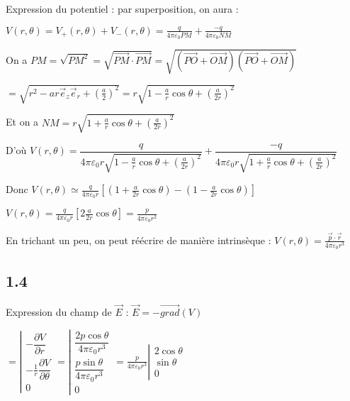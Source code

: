 \documentclass[a4paper,12pt]{book}
\begin{document}
\par Expression du potentiel : par superposition, on aura :
\par $V(r,\theta) = V_+(r,\theta)+V_-(r,\theta)=\frac{q}{4\pi\varepsilon_0PM} + \frac{-q}{4\pi\varepsilon_0NM}$
\par On a $PM=\sqrt{PM^2}=\sqrt{\vec{PM}\cdot\vec{PM}}=\sqrt{(\vec{PO}+\vec{OM})(\vec{PO}+\vec{OM})}$ \par $= \sqrt{r^2-ar\vec{e}_z\vec{e}_r+\left(\frac{a}{2}\right)^2} = r\sqrt{1-\frac{a}{r}\cos\theta + \left(\frac{a}{2r}\right)^2}$
\par Et on a $NM= r\sqrt{1+\frac{a}{r}\cos\theta + \left(\frac{a}{2r}\right)^2}$
\par D'où $V(r,\theta)=\dfrac{q}{4\pi\varepsilon_0 r\sqrt{1-\frac{a}{r}\cos\theta + \left(\frac{a}{2r}\right)^2}}+\dfrac{-q}{4\pi\varepsilon_0 r\sqrt{1+\frac{a}{r}\cos\theta + \left(\frac{a}{2r}\right)^2}}$
\par Donc $V(r,\theta)\simeq\frac{q}{4\pi\varepsilon_0r}\left[\left(1+\frac{a}{2r}\cos\theta\right)-\left(1-\frac{a}{2r}\cos\theta\right)\right]$
\par $V(r,\theta)=\frac{q}{4\pi\varepsilon_0 r}\left[2\frac{a}{2r}\cos\theta\right]= \frac{p}{4\pi\varepsilon_0r^2}$
\par En trichant un peu, on peut réécrire de manière intrinsèque : $V(r,\theta)=\frac{\vec{p}\cdot\vec{r}}{4\pi\varepsilon_0r^3}$

\subsection{1.4}
Expression du champ de $\vec{E}$ : $\vec{E}=-\vec{grad}(V)$
\par $ = \left|\begin{matrix} -\dfrac{\partial V}{\partial r} \\ -\frac{1}{r}\dfrac{\partial V}{\partial \theta} \\ 0\end{matrix}\right. =\left|\begin{matrix} \dfrac{2p\cos\theta}{4\pi\varepsilon_0r^3} \\ \dfrac{p\sin\theta}{4\pi\varepsilon_0 r^3} \\ 0 \end{matrix}\right.= \frac{p}{4\pi\varepsilon_0r^3}\left|\begin{matrix}2\cos\theta \\ \sin\theta \\ 0 \end{matrix}\right.$
\end{document}
